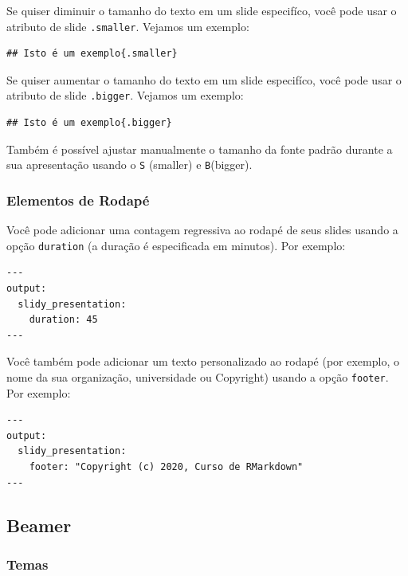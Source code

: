 \documentclass[
]{book}
\begin{document}
Se quiser diminuir o tamanho do texto em um slide especifíco, você pode usar o atributo de slide \texttt{.smaller}. Vejamos um exemplo:

\begin{verbatim}
## Isto é um exemplo{.smaller}
\end{verbatim}

Se quiser aumentar o tamanho do texto em um slide especifíco, você pode usar o atributo de slide \texttt{.bigger}. Vejamos um exemplo:

\begin{verbatim}
## Isto é um exemplo{.bigger}
\end{verbatim}

Também é possível ajustar manualmente o tamanho da fonte padrão durante a sua apresentação usando o \texttt{\textquotesingle{}S\textquotesingle{}} (smaller) e \texttt{B}(bigger).

\hypertarget{elementos-de-rodapuxe9}{%
\subsubsection*{Elementos de Rodapé}\label{elementos-de-rodapuxe9}}

Você pode adicionar uma contagem regressiva ao rodapé de seus slides usando a opção \texttt{duration} (a duração é especificada em minutos). Por exemplo:

\begin{verbatim}
---
output:
  slidy_presentation:
    duration: 45
---
\end{verbatim}

Você também pode adicionar um texto personalizado ao rodapé (por exemplo, o nome da sua organização, universidade ou Copyright) usando a opção \texttt{footer}. Por exemplo:

\begin{verbatim}
---
output:
  slidy_presentation:
    footer: "Copyright (c) 2020, Curso de RMarkdown"
---
\end{verbatim}

\hypertarget{beamer}{%
\subsection{Beamer}\label{beamer}}

\hypertarget{temas}{%
\subsubsection*{Temas}\label{temas}}
\end{document}
